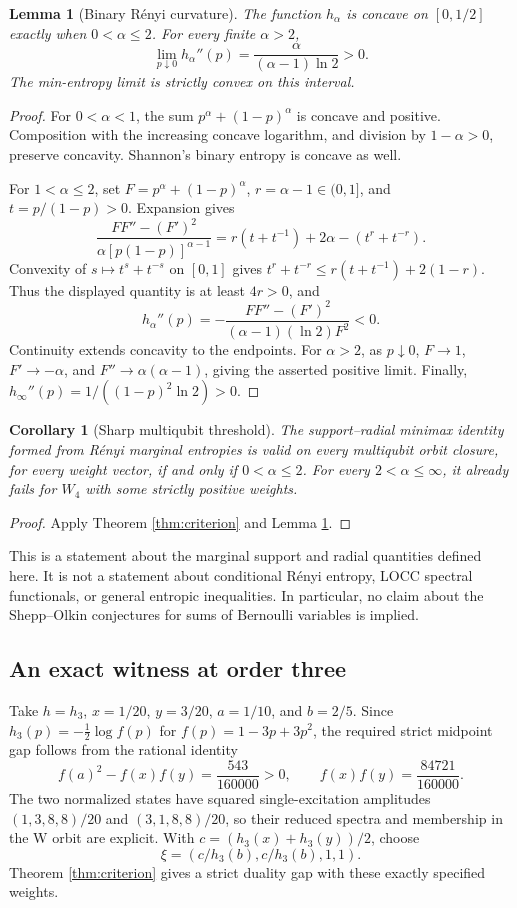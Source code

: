 \documentclass[11pt,a4paper]{article}
\newtheorem{lemma}[theorem]{Lemma}
\newtheorem{corollary}[theorem]{Corollary}
\begin{document}
\begin{lemma}[Binary R\'enyi curvature]\label{lem:renyi}
The function \(h_\alpha\) is concave on \([0,1/2]\) exactly when
\(0<\alpha\le2\). For every finite \(\alpha>2\),
\[
 \lim_{p\downarrow0}h_\alpha''(p)
 =\frac{\alpha}{(\alpha-1)\ln2}>0.
\]
The min-entropy limit is strictly convex on this interval.
\end{lemma}
\begin{proof}
For \(0<\alpha<1\), the sum \(p^\alpha+(1-p)^\alpha\) is concave
and positive. Composition with the increasing concave logarithm,
and division by \(1-\alpha>0\), preserve concavity. Shannon's
binary entropy is concave as well.

For \(1<\alpha\le2\), set \(F=p^\alpha+(1-p)^\alpha\),
\(r=\alpha-1\in(0,1]\), and \(t=p/(1-p)>0\). Expansion gives
\[
 \frac{FF''-(F')^2}{\alpha[p(1-p)]^{\alpha-1}}
 =r(t+t^{-1})+2\alpha-(t^r+t^{-r}).
\]
Convexity of \(s\mapsto t^s+t^{-s}\) on \([0,1]\) gives
\(t^r+t^{-r}\le r(t+t^{-1})+2(1-r)\).
Thus the displayed quantity is at least \(4r>0\), and
\[
 h_\alpha''(p)
 =-\frac{FF''-(F')^2}{(\alpha-1)(\ln2)F^2}<0.
\]
Continuity extends concavity to the endpoints. For \(\alpha>2\),
as \(p\downarrow0\), \(F\to1\), \(F'\to-\alpha\), and
\(F''\to\alpha(\alpha-1)\), giving the asserted positive limit.
Finally, \(h_\infty''(p)=1/((1-p)^2\ln2)>0\).
\end{proof}

\begin{corollary}[Sharp multiqubit threshold]\label{cor:threshold}
The support--radial minimax identity formed from R\'enyi marginal
entropies is valid on every multiqubit orbit closure, for every weight
vector, if and only if \(0<\alpha\le2\).
For every \(2<\alpha\le\infty\), it already fails for \(W_4\)
with some strictly positive weights.
\end{corollary}
\begin{proof}
Apply Theorem \ref{thm:criterion} and Lemma \ref{lem:renyi}.
\end{proof}

This is a statement about the marginal support and radial quantities
defined here. It is not a statement about conditional R\'enyi entropy,
LOCC spectral functionals, or general entropic inequalities.
In particular, no claim about the Shepp--Olkin conjectures for sums
of Bernoulli variables is implied.

\subsection{An exact witness at order three}
Take \(h=h_3\), \(x=1/20\), \(y=3/20\), \(a=1/10\),
and \(b=2/5\). Since \(h_3(p)=-\tfrac12\log f(p)\) for
\(f(p)=1-3p+3p^2\), the required strict midpoint gap follows from
the rational identity
\[
 f(a)^2-f(x)f(y)=\frac{543}{160000}>0,
 \qquad f(x)f(y)=\frac{84721}{160000}.
\]
The two normalized states have squared single-excitation amplitudes
\((1,3,8,8)/20\) and \((3,1,8,8)/20\), so their reduced spectra
and membership in the W orbit are explicit. With
\(c=(h_3(x)+h_3(y))/2\), choose
\[
 \xi=(c/h_3(b),c/h_3(b),1,1).
\]
Theorem \ref{thm:criterion} gives a strict duality gap with these
exactly specified weights.
\end{document}

